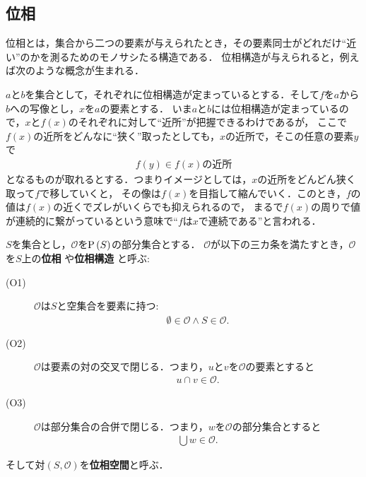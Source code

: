 \subsection{位相}
	位相とは，集合から二つの要素が与えられたとき，その要素同士がどれだけ``近い''のかを測るためのモノサシたる構造である．
	位相構造が与えられると，例えば次のような概念が生まれる．
	
	$a$と$b$を集合として，それぞれに位相構造が定まっているとする．そして$f$を$a$から$b$への写像とし，$x$を$a$の要素とする．
	いま$a$と$b$には位相構造が定まっているので，$x$と$f(x)$のそれぞれに対して``近所''が把握できるわけであるが，
	ここで$f(x)$の近所をどんなに``狭く''取ったとしても，$x$の近所で，そこの任意の要素$y$で
	\begin{align}
		f(y) \in \mbox{$f(x)$の近所}
	\end{align}
	となるものが取れるとする．つまりイメージとしては，$x$の近所をどんどん狭く取って$f$で移していくと，
	その像は$f(x)$を目指して縮んでいく．このとき，$f$の値は$f(x)$の近くでズレがいくらでも抑えられるので，
	まるで$f(x)$の周りで値が連続的に繋がっているという意味で``$f$は$x$で連続である''と言われる．
	
	\begin{screen}
		\begin{dfn}[位相]
			$S$を集合とし，$\mathscr{O}$を$\operatorname*{P} \left(S\right)$の部分集合とする．
			$\mathscr{O}$が以下の三カ条を満たすとき，$\mathscr{O}$を$S$上の{\bf 位相}
			や{\bf 位相構造}
			と呼ぶ:
			\begin{description}
				\item[(O1)] $\mathscr{O}$は$S$と空集合を要素に持つ:
					\begin{align}
						\emptyset \in \mathscr{O} \wedge S \in \mathscr{O}.
					\end{align}
				\item[(O2)] $\mathscr{O}$は要素の対の交叉で閉じる．つまり，$u$と$v$を$\mathscr{O}$の要素とすると
					\begin{align}
						u \cap v \in \mathscr{O}.
					\end{align}
				\item[(O3)] $\mathscr{O}$は部分集合の合併で閉じる．つまり，$w$を$\mathscr{O}$の部分集合とすると
					\begin{align}
						\bigcup w \in \mathscr{O}.
					\end{align}
			\end{description}
			そして対$(S,\mathscr{O})$を{\bf 位相空間}と呼ぶ．
		\end{dfn}
	\end{screen}
	
